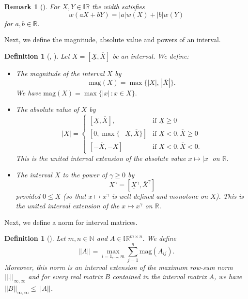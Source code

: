 \documentclass[a4paper, 11pt]{article}
\newtheorem{definition}[theorem]{Definition}
\newtheorem{remark}[theorem]{Remark}
\begin{document}
	\begin{remark}[\cite{moore2009introduction}]\label{rem: width linearity}
		For $X,Y\in\mathbb{IR}$ the width satisfies
		$$ w(aX + bY) = |a|w(X) + |b|w(Y) $$
		for $a,b\in \mathbb{R}$.
	\end{remark}
	
	Next, we define the magnitude, absolute value and powers of an interval.
	
	\begin{definition}[\cite{rump2010verification}, \cite{moore2009introduction}]\label{def: mag abs power}
		Let $X= [\underline{X}, \overline{X}]$ be an interval. We define:
        \begin{itemize}
            \item The magnitude of the interval $X$ by
            $$ \mathrm{mag}(X) = \max\{|\underline{X}|, \,|\overline{X}|\}. $$
            We have $\mathrm{mag}(X) = \max\{|x| \, : x \in X\}.$
            \item The absolute value of $X$ by
            $$ |X| =  \begin{cases}
				[\underline{X}, \overline{X}], & \text{if } \underline{X}\geq 0 \\
				[0, \max\{-\underline{X}, \overline{X}\}] & \text{if }\underline{X}<0, \overline{X}\geq 0 \\
				[-\overline{X}, -\underline{X}] & \text{if }\underline{X}<0,\overline{X}< 0.
			\end{cases}$$
            This is the united interval extension of the absolute value $x \mapsto |x|$ on $\mathbb{R}$.
            \item The interval $X$ to the power of $\gamma \geq 0$ by
            $$ X^\gamma = [\underline{X}^{\gamma}, \overline{X}^{\gamma}]  $$
            provided $0 \leq \underline X$ (so that $x\mapsto x^\gamma$ is well-defined and monotone on $X$). This is the united interval extension of the $x \mapsto x^\gamma$ on $\mathbb{R}$.
        \end{itemize}
	\end{definition}

	
	Next, we define a norm for interval matrices. 
	
	\begin{definition}[\cite{moore2009introduction}]\label{def: interval matrix norm}
		Let $m,n\in \mathbb{N}$ and $A \in \mathbb{IR}^{m\times n}$. We define
		\begin{equation}
			||A|| = \max_{i=1,\dotsc, m} \sum_{j=1}^n\mathrm{mag}(A_{ij}).
		\end{equation}
		Moreover, this norm is an interval extension of the maximum row-sum norm $||.||_{\infty,\infty}$ and for every real matrix $B$ contained in the interval matrix $A$, we have $||B||_{\infty, \infty} \leq ||A||$.
	\end{definition}
\end{document}
